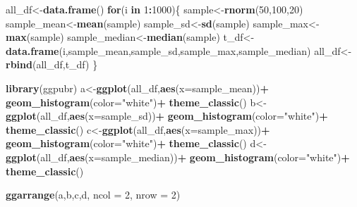 \documentclass[
]{book}
\newenvironment{Shaded}{\begin{snugshade}}{\end{snugshade}}
\newcommand{\AttributeTok}[1]{\textcolor[rgb]{0.13,0.29,0.53}{#1}}
\newcommand{\ControlFlowTok}[1]{\textcolor[rgb]{0.13,0.29,0.53}{\textbf{#1}}}
\newcommand{\DecValTok}[1]{\textcolor[rgb]{0.00,0.00,0.81}{#1}}
\newcommand{\FunctionTok}[1]{\textcolor[rgb]{0.13,0.29,0.53}{\textbf{#1}}}
\newcommand{\NormalTok}[1]{#1}
\newcommand{\OtherTok}[1]{\textcolor[rgb]{0.56,0.35,0.01}{#1}}
\newcommand{\SpecialCharTok}[1]{\textcolor[rgb]{0.81,0.36,0.00}{\textbf{#1}}}
\newcommand{\StringTok}[1]{\textcolor[rgb]{0.31,0.60,0.02}{#1}}
\begin{document}
\begin{Shaded}
\begin{Highlighting}[]
\NormalTok{all\_df}\OtherTok{\textless{}{-}}\FunctionTok{data.frame}\NormalTok{()}
\ControlFlowTok{for}\NormalTok{(i }\ControlFlowTok{in} \DecValTok{1}\SpecialCharTok{:}\DecValTok{1000}\NormalTok{)\{}
\NormalTok{  sample}\OtherTok{\textless{}{-}}\FunctionTok{rnorm}\NormalTok{(}\DecValTok{50}\NormalTok{,}\DecValTok{100}\NormalTok{,}\DecValTok{20}\NormalTok{)}
\NormalTok{  sample\_mean}\OtherTok{\textless{}{-}}\FunctionTok{mean}\NormalTok{(sample)}
\NormalTok{  sample\_sd}\OtherTok{\textless{}{-}}\FunctionTok{sd}\NormalTok{(sample)}
\NormalTok{  sample\_max}\OtherTok{\textless{}{-}}\FunctionTok{max}\NormalTok{(sample)}
\NormalTok{  sample\_median}\OtherTok{\textless{}{-}}\FunctionTok{median}\NormalTok{(sample)}
\NormalTok{  t\_df}\OtherTok{\textless{}{-}}\FunctionTok{data.frame}\NormalTok{(i,sample\_mean,sample\_sd,sample\_max,sample\_median)}
\NormalTok{  all\_df}\OtherTok{\textless{}{-}}\FunctionTok{rbind}\NormalTok{(all\_df,t\_df)}
\NormalTok{\}}

\FunctionTok{library}\NormalTok{(ggpubr)}
\NormalTok{a}\OtherTok{\textless{}{-}}\FunctionTok{ggplot}\NormalTok{(all\_df,}\FunctionTok{aes}\NormalTok{(}\AttributeTok{x=}\NormalTok{sample\_mean))}\SpecialCharTok{+}
  \FunctionTok{geom\_histogram}\NormalTok{(}\AttributeTok{color=}\StringTok{"white"}\NormalTok{)}\SpecialCharTok{+}
  \FunctionTok{theme\_classic}\NormalTok{()}
\NormalTok{b}\OtherTok{\textless{}{-}}\FunctionTok{ggplot}\NormalTok{(all\_df,}\FunctionTok{aes}\NormalTok{(}\AttributeTok{x=}\NormalTok{sample\_sd))}\SpecialCharTok{+}
  \FunctionTok{geom\_histogram}\NormalTok{(}\AttributeTok{color=}\StringTok{"white"}\NormalTok{)}\SpecialCharTok{+}
  \FunctionTok{theme\_classic}\NormalTok{()}
\NormalTok{c}\OtherTok{\textless{}{-}}\FunctionTok{ggplot}\NormalTok{(all\_df,}\FunctionTok{aes}\NormalTok{(}\AttributeTok{x=}\NormalTok{sample\_max))}\SpecialCharTok{+}
  \FunctionTok{geom\_histogram}\NormalTok{(}\AttributeTok{color=}\StringTok{"white"}\NormalTok{)}\SpecialCharTok{+}
  \FunctionTok{theme\_classic}\NormalTok{()}
\NormalTok{d}\OtherTok{\textless{}{-}}\FunctionTok{ggplot}\NormalTok{(all\_df,}\FunctionTok{aes}\NormalTok{(}\AttributeTok{x=}\NormalTok{sample\_median))}\SpecialCharTok{+}
  \FunctionTok{geom\_histogram}\NormalTok{(}\AttributeTok{color=}\StringTok{"white"}\NormalTok{)}\SpecialCharTok{+}
  \FunctionTok{theme\_classic}\NormalTok{()}

\FunctionTok{ggarrange}\NormalTok{(a,b,c,d,}
          \AttributeTok{ncol =} \DecValTok{2}\NormalTok{, }\AttributeTok{nrow =} \DecValTok{2}\NormalTok{)}
\end{Highlighting}
\end{Shaded}
\end{document}
